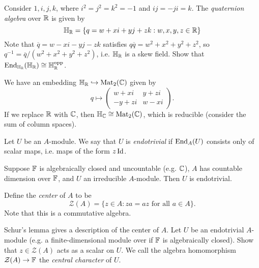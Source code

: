\begin{exercise}
  Consider $1, i, j, k$, where
  $i^2 = j^2 = k^2 = -1$ and
  $ij = -ji = k$. The
  \emph{quaternion algebra} over $\mathbb{R}$ is
  given by
  \[
    \mathbb{H}_{\mathbb{R}}
    = \{q = w + xi + yj + zk : w, x, y, z \in \mathbb{R}\}
  \]
  Note that $\overline{q} = w - xi - yj - zk$
  satisfies
  $q \overline{q} = w^2 + x^2 + y^2 + z^2$,
  so $q^{-1} = \overline{q} / (w^2 + x^2 + y^2 + z^2)$, i.e.
  $\mathbb{H}_{\mathbb{R}}$ is a skew field.
  Show that
  $\operatorname{End}_{\mathbb{H}_{\mathbb{R}}}(\mathbb{H}_{\mathbb{R}}) \cong \mathbb{H}_{\mathbb{R}}^\mathrm{opp}$.
\end{exercise}

\begin{remark}
  We have an embedding
  $\mathbb{H}_{\mathbb{R}} \hookrightarrow \operatorname{Mat}_2(\mathbb{C})$
  given by
  \[
    q \longmapsto
    \begin{pmatrix}
      w + xi & y + zi \\
      -y + zi & w - xi
    \end{pmatrix}.
  \]
  If we replace $\mathbb{R}$ with $\mathbb{C}$, then
  $\mathbb{H}_{\mathbb{C}} \cong \operatorname{Mat}_2(\mathbb{C})$,
  which is reducible (consider the sum of
  column spaces).
\end{remark}

\begin{definition}
  Let $U$ be an $A$-module. We say that
  $U$ is \emph{endotrivial} if
  $\operatorname{End}_A(U)$ consists only of scalar maps,
  i.e. maps of the form $z \operatorname{Id}$.
\end{definition}

\begin{remark}
  Suppose $\mathbb{F}$ is algebraically closed and
  uncountable (e.g. $\mathbb{C}$), $A$ has
  countable dimension over $\mathbb{F}$, and
  $U$ an irreducible $A$-module. Then
  $U$ is endotrivial.
\end{remark}

\begin{definition}
  Define the \emph{center} of $A$ to be
  \[
    \mathcal{Z}(A) = \{z \in A : za = az \text{ for all } a \in A\}.
  \]
  Note that this is a commutative algebra.
\end{definition}

\begin{exercise}
  Schur's lemma gives a description of
  the center of $A$.
  Let $U$ be an endotrivial $A$-module
  (e.g. a finite-dimensional module over
  if $\mathbb{F}$ is algebraically closed).
  Show that $z \in \mathcal{Z}(A)$ 
  acts as a scalar on $U$. We call the
  algebra homomorphism
  $\mathcal{Z}(A) \to \mathbb{F}$ the
  \emph{central character} of $U$.
\end{exercise}

